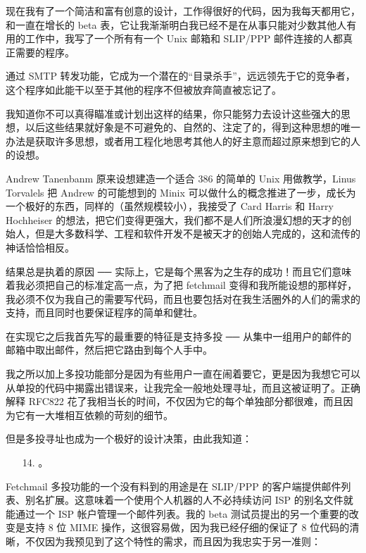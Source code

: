 现在我有了一个简洁和富有创意的设计，工作得很好的代码，因为我每天都用它，和一直在增长的 beta 表，它让我渐渐明白我已经不是在从事只能对少数其他人有用的工作中，我写了一个所有有一个 Unix 邮箱和 SLIP/PPP 邮件连接的人都真正需要的程序。


通过 SMTP 转发功能，它成为一个潜在的“目录杀手”，远远领先于它的竞争者，这个程序如此能干以至于其他的程序不但被放弃简直被忘记了。


我知道你不可以真得瞄准或计划出这样的结果，你只能努力去设计这些强大的思想，以后这些结果就好象是不可避免的、自然的、注定了的，得到这种思想的唯一办法是获取许多思想，或者用工程化地思考其他人的好主意而超过原来想到它的人的设想。


Andrew Tanenbanm 原来设想建造一个适合 386 的简单的 Unix 用做教学，Linus Torvalels 把 Andrew 的可能想到的 Minix 可以做什么的概念推进了一步，成长为一个极好的东西，同样的（虽然规模较小），我接受了 Card Harris 和 Harry Hochheiser 的想法，把它们变得更强大，我们都不是人们所浪漫幻想的天才的创始人，但是大多数科学、工程和软件开发不是被天才的创始人完成的，这和流传的神话恰恰相反。


结果总是执着的原因 ── 实际上，它是每个黑客为之生存的成功！而且它们意味着我必须把自己的标准定高一点，为了把 fetchmail 变得和我所能设想的那样好，我必须不仅为我自己的需要写代码，而且也要包括对在我生活圈外的人们的需求的支持，而且同时也要保证程序的简单和健壮。

在实现它之后我首先写的最重要的特征是支持多投 ── 从集中一组用户的邮件的邮箱中取出邮件，然后把它路由到每个人手中。


我之所以加上多投功能部分是因为有些用户一直在闹着要它，更是因为我想它可以从单投的代码中揭露出错误来，让我完全一般地处理寻址，而且这被证明了。正确解释 RFC822 花了我相当长的时间，不仅因为它的每个单独部分都很难，而且因为它有一大堆相互依赖的苛刻的细节。


但是多投寻址也成为一个极好的设计决策，由此我知道：

\begin{enumerate}
\item[14.] 。
\end{enumerate}

Fetchmail 多投功能的一个没有料到的用途是在 SLIP/PPP 的客户端提供邮件列表、别名扩展。这意味着一个使用个人机器的人不必持续访问 ISP 的别名文件就能通过一个 ISP 帐户管理一个邮件列表。我的 beta 测试员提出的另一个重要的改变是支持 8 位 MIME 操作，这很容易做，因为我已经仔细的保证了 8 位代码的清晰，不仅因为我预见到了这个特性的需求，而且因为我忠实于另一准则：

